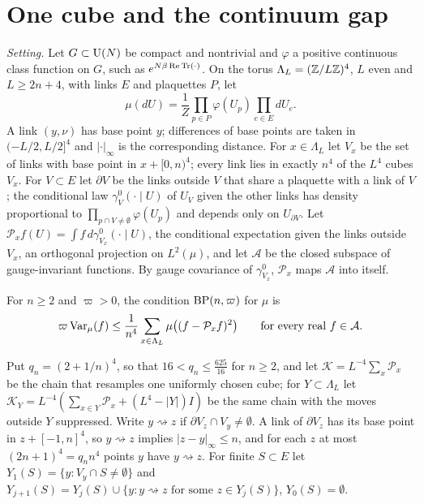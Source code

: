 \section{One cube and the continuum gap}\label{sec:cube}

\emph{Setting.} Let $G\subset\mathrm{U}(N)$ be compact and nontrivial and $\varphi$ a
positive continuous class function on $G$, such as $e^{N\beta\operatorname{Re}\operatorname{Tr}(\cdot)}$. On
the torus $\Lambda_L=(\mathbb{Z}/L\mathbb{Z})^4$, $L$ even and $L\ge2n+4$, with links $E$ and
plaquettes $P$, let
\[
\mu(dU)=\frac1Z\prod_{p\in P}\varphi(U_p)\prod_{e\in E}dU_e .
\]
A link $(y,\nu)$ has base point $y$; differences of base points are taken in
$(-L/2,L/2]^4$ and $|\cdot|_\infty$ is the corresponding distance. For
$x\in\Lambda_L$ let $V_x$ be the set of links with base point in $x+[0,n)^4$;
every link lies in exactly $n^4$ of the $L^4$ cubes $V_x$. For $V\subset E$ let
$\partial V$ be the links outside $V$ that share a plaquette with a link of
$V$; the conditional law $\gamma^0_V(\cdot\mid U)$ of $U_V$ given the other links
has density proportional to $\prod_{p\cap V\ne\emptyset}\varphi(U_p)$ and depends
only on $U_{\partial V}$. Let $\mathcal P_xf(U)=\int f\,d\gamma^0_{V_x}(\cdot\mid U)$,
the conditional expectation given the links outside $V_x$, an orthogonal
projection on $L^2(\mu)$, and let $\mathcal A$ be the closed subspace of
gauge-invariant functions. By gauge covariance of $\gamma^0_{V_x}$, $\mathcal P_x$
maps $\mathcal A$ into itself.

\begin{definition}\label{def:bp}
For $n\ge2$ and $\varpi>0$, the condition $\mathrm{BP}(n,\varpi)$ for $\mu$ is
\[
\varpi\operatorname{Var}_\mu(f)\le\frac1{n^4}\sum_{x\in\Lambda_L}\mu\bigl((f-\mathcal P_xf)^2\bigr)
\qquad\text{for every real }f\in\mathcal A .
\]
\end{definition}

Put $q_n=(2+1/n)^4$, so that $16<q_n\le\frac{625}{16}$ for $n\ge2$, and let
$\mathcal K=L^{-4}\sum_x\mathcal P_x$ be the chain that resamples one uniformly
chosen cube; for $Y\subset\Lambda_L$ let $\mathcal K_Y=L^{-4}(\sum_{x\in Y}\mathcal P_x
+(L^4-|Y|)I)$ be the same chain with the moves outside $Y$ suppressed. Write
$y\rightsquigarrow z$ if $\partial V_z\cap V_y\ne\emptyset$. A link of $\partial
V_z$ has its base point in $z+[-1,n]^4$, so $y\rightsquigarrow z$ implies
$|z-y|_\infty\le n$, and for each $z$ at most $(2n+1)^4=q_nn^4$ points $y$ have
$y\rightsquigarrow z$. For finite $S\subset E$ let $Y_1(S)=\{y:V_y\cap S\ne
\emptyset\}$ and $Y_{j+1}(S)=Y_j(S)\cup\{y:y\rightsquigarrow z\text{ for some }
z\in Y_j(S)\}$, $Y_0(S)=\emptyset$.

